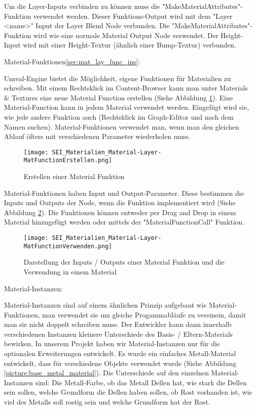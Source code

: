 Um die Layer-Inputs verbinden zu können muss die "MakeMaterialAttributes"-Funktion verwendet werden. Dieser
Funktions-Output wird mit dem "Layer <name>" Input der Layer Blend Node verbunden. Die
"MakeMaterialAttributes"-Funktion wird wie eine normale Material Output Node verwendet. Der Height-Input wird mit einer
Height-Textur (ähnlich einer Bump-Textur) verbunden.

Material-Funktionen\ref{sec:mat_lay_func_ins}:

Unreal-Engine bietet die Möglichkeit, eigene Funktionen für Materialien zu schreiben. Mit einem Rechtsklick im
Content-Browser kann man unter Materials & Textures eine neue Material Function erstellen (Siehe
Abbildung \ref{picture:make_mat_func}). Eine Material-Function kann in jedem Material verwendet werden. Eingefügt wird sie, wie jede andere
Funktion auch (Rechtsklick im Graph-Editor und nach dem Namen suchen). Material-Funktionen verwendet man, wenn man
den gleichen Ablauf öfters mit verschiedenen Parameter wiederholen muss.

\begin{figure}[H]
    \centering
    \texttt{[image: SEI\_Materialien\_Material-Layer-MatFunctionErstellen.png]}
    \caption{Erstellen einer Material Funktion}
    \label{picture:make_mat_func}
\end{figure}

Material-Funktionen haben Input und Output-Parameter. Diese bestimmen die Inputs und Outputs der Node, wenn die
Funktion implementiert wird (Siehe Abbildung \ref{picture:use_mat_func}). Die Funktionen können entweder per Drag and
Drop in einem Material hinzugefügt werden oder mittels der "MaterialFunctionCall" Funktion.

\begin{figure}[H]
    \centering
    \texttt{[image: SEI\_Materialien\_Material-Layer-MatFunctionVerwenden.png]}
    \caption{Darstellung der Inputs / Outputs einer Material Funktion und die Verwendung in einem Material}
    \label{picture:use_mat_func}
\end{figure}

Material-Instanzen\citep{ue:mat_instances}:

Material-Instanzen sind auf einem ähnlichen Prinzip aufgebaut wie Material-Funktionen, man verwendet sie um gleiche
Progammabläufe zu vereinein, damit man sie nicht doppelt schreiben muss. Der Entwickler kann dann innerhalb
verschiedenen Instanzen kleinere Unterschiede des Basis- / Eltern-Materials bewirken. In unserem Projekt haben wir
Material-Instanzen nur für die optionalen Erweiterungen entwickelt. Es wurde ein einfaches Metall-Material entwickelt,
dass für verschiedene Objekte verwendet wurde (Siehe Abbildung \ref{picture:base_metal_material}). Die Unterschiede auf
den einzelnen Material-Instanzen sind: Die Metall-Farbe, ob das Metall Dellen hat, wie stark die Dellen sein sollen,
welche Grundform die Dellen haben sollen, ob Rost vorhanden ist, wie viel des Metalls soll rostig sein und welche
Grundform hat der Rost.

